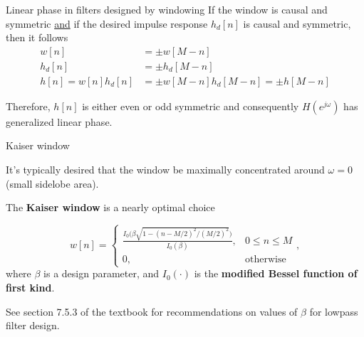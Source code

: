 \documentclass[10pt]{beamer}
\begin{document}
%
\begin{frame}{Linear phase in filters designed by windowing}
	If the window is causal and symmetric \underline{and} if the desired impulse response $h_d[n]$ is causal and symmetric, then it follows
	\begin{align}
		w[n] &= \pm w[M-n] \tag{causal and symmetric window} \\
		h_d[n] &= \pm h_d[M-n] \tag{causal and symmetric $h_d[n]$} \\
		h[n] = w[n]h_d[n] &= \pm w[M-n]h_d[M-n] = \pm h[M-n] \tag{causal and symmetric $h[n]$}
	\end{align}
	
	Therefore, $h[n]$ is either even or odd symmetric and consequently $H(e^{j\omega})$ has generalized linear phase.
	
\end{frame}

%
\begin{frame}{Kaiser window}

It's typically desired that the window be maximally concentrated around $\omega = 0$ (small sidelobe area).

The \textbf{Kaiser window} is a nearly optimal choice

\begin{equation*}
	w[n] = \begin{cases}
	\displaystyle\frac{I_0\Big(\beta\sqrt{1- (n-M/2)^2/(M/2)^2}\Big)}{I_0(\beta)}, & 0 \leq n \leq M \\
	0, & \text{otherwise}
	\end{cases},
\end{equation*}
where $\beta$ is a design parameter, and $I_0(\cdot)$ is the \textbf{modified Bessel function of first kind}.

See section 7.5.3 of the textbook for recommendations on values of $\beta$ for lowpass filter design.

\end{frame}
\end{document}
